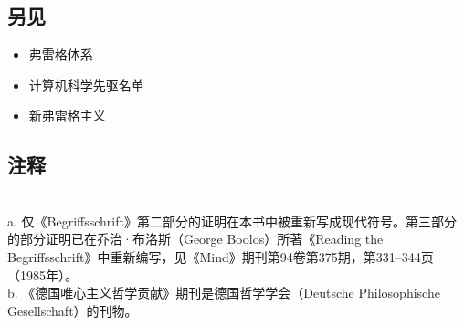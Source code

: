 \subsection{另见}
\begin{itemize}
\item 弗雷格体系  
\item 计算机科学先驱名单  
\item 新弗雷格主义  
\end{itemize}
\subsection{注释}\\
a. 仅《Begriffsschrift》第二部分的证明在本书中被重新写成现代符号。第三部分的部分证明已在乔治·布洛斯（George Boolos）所著《Reading the Begriffsschrift》中重新编写，见《Mind》期刊第94卷第375期，第331–344页（1985年）。\\  
b. 《德国唯心主义哲学贡献》期刊是德国哲学学会（Deutsche Philosophische Gesellschaft）的刊物。
